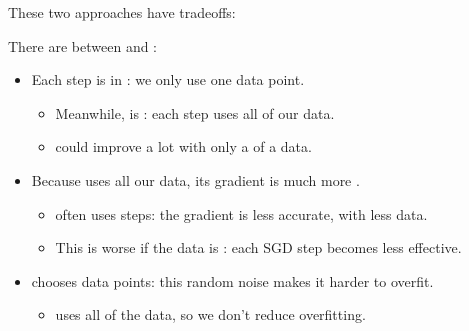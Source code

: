             These two approaches have tradeoffs:\\
            
            \begin{concept}
                There are  between  and :
                
                \begin{itemize}
                    \item Each step is  in : we only use one data point. 
                        \begin{itemize}
                            \item Meanwhile,  is : each step uses all of our data.
                            \item {} could improve a lot with only a  of a data.
                        \end{itemize}

                        \phantom{}
                        
                    \item Because  uses all our data, its gradient is much more .
                        \begin{itemize}
                            \item {} often uses  steps: the gradient is less accurate, with less data.
                            \item This is worse if the data is : each SGD step becomes less effective.
                        \end{itemize}

                        \phantom{}
                        
                    \item {}  chooses data points: this random noise makes it harder to overfit.
                        \begin{itemize}
                            \item {} uses all of the data, so we don't reduce overfitting.
                        \end{itemize}
                \end{itemize}
            \end{concept}
        
        \phantom{}
        
